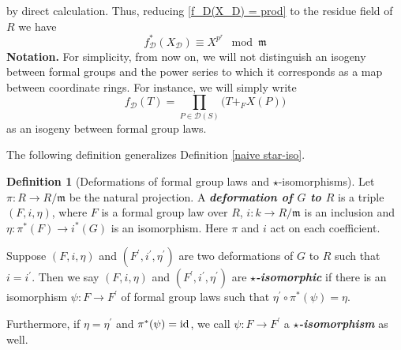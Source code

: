 \documentclass[12pt]{article}
\theoremstyle{definition}
\newtheorem{definition}[theorem]{Definition}
\def\m{\mathfrak{m}}
\begin{document}
    by direct calculation. Thus, reducing \eqref{f_D(X_D) = prod} to the residue field of $R$ we have 
    \begin{equation} \label{f restricts to Frob} 
        f_\mathcal{D}^*(X_\mathcal{D}) \equiv X^{p^r} \mod{\m}
    \end{equation}
    \textbf{Notation. }For simplicity, from now on, we will not distinguish an isogeny between formal groups and the power series to which it corresponds as a map between coordinate rings. For instance, we will simply write
    \begin{equation*}
        f_\mathcal{D}(T) = \prod_{P \in \mathcal{D}(S)}\bigl(T +_F X(P)\bigr)
    \end{equation*}
    as an isogeny between formal group laws. \par 
    The following definition generalizes Definition \ref{naive star-iso}. 
    \begin{definition}[Deformations of formal group laws and $\star$-isomorphisms]
        Let $\pi \colon R \to R/\m$ be the natural projection. A \textbf{\em{deformation of $G$ to $R$}} is a triple $(F,i,\eta)$, where $F$ is a formal group law over $R$, $i \colon k \to R/\m$ is an inclusion and $\eta \colon \pi^*(F) \to i^*(G)$ is an isomorphism. Here $\pi$ and $i$ act on each coefficient. \par 
        Suppose $(F,i,\eta)$ and $(F^\prime,i^\prime,\eta^\prime)$ are two deformations of $G$ to $R$ such that $i = i^\prime$. Then we say $(F,i,\eta)$ and $(F^\prime,i^\prime,\eta^\prime)$ are \textbf{\em{$\star$-isomorphic}} if there is an isomorphism $\psi \colon F \to F^\prime$ of formal group laws such that $\eta^\prime \circ \pi^*(\psi) = \eta$. \par 
        Furthermore, if $\eta = \eta^\prime$ and $\pi^*(\psi) = \rm{id}$, we call $\psi \colon F \to F^\prime$ a \textbf{\em{$\star$-isomorphism}} as well. 
    \end{definition}
\end{document}
